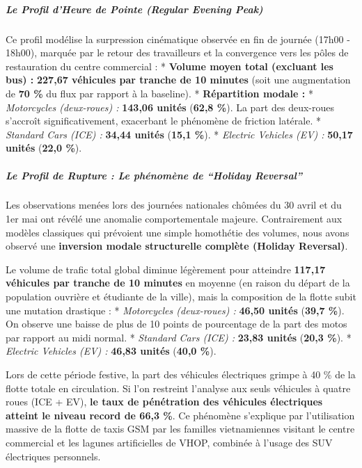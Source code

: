 \documentclass[10pt, a4paper]{article}
\begin{document}
\subparagraph{Le Profil d'Heure de Pointe (Regular Evening
Peak)}\label{le-profil-dheure-de-pointe-regular-evening-peak}

Ce profil modélise la surpression cinématique observée en fin de journée
(17h00 - 18h00), marquée par le retour des travailleurs et la
convergence vers les pôles de restauration du centre commercial : *
\textbf{Volume moyen total (excluant les bus) :} \textbf{227,67
véhicules par tranche de 10 minutes} (soit une augmentation de
\textbf{70 \%} du flux par rapport à la baseline). * \textbf{Répartition
modale :} * \emph{Motorcycles (deux-roues) :} \textbf{143,06 unités}
(\textbf{62,8 \%}). La part des deux-roues s'accroît significativement,
exacerbant le phénomène de friction latérale. * \emph{Standard Cars
(ICE) :} \textbf{34,44 unités} (\textbf{15,1 \%}). * \emph{Electric
Vehicles (EV) :} \textbf{50,17 unités} (\textbf{22,0 \%}).

\subparagraph{Le Profil de Rupture : Le phénomène de ``Holiday
Reversal''}\label{le-profil-de-rupture-le-phuxe9nomuxe8ne-de-holiday-reversal}

Les observations menées lors des journées nationales chômées du 30 avril
et du 1er mai ont révélé une anomalie comportementale majeure.
Contrairement aux modèles classiques qui prévoient une simple homothétie
des volumes, nous avons observé une \textbf{inversion modale
structurelle complète (Holiday Reversal)}.

Le volume de trafic total global diminue légèrement pour atteindre
\textbf{117,17 véhicules par tranche de 10 minutes} en moyenne (en
raison du départ de la population ouvrière et étudiante de la ville),
mais la composition de la flotte subit une mutation drastique : *
\emph{Motorcycles (deux-roues) :} \textbf{46,50 unités} (\textbf{39,7
\%}). On observe une baisse de plus de 10 points de pourcentage de la
part des motos par rapport au midi normal. * \emph{Standard Cars (ICE)
:} \textbf{23,83 unités} (\textbf{20,3 \%}). * \emph{Electric Vehicles
(EV) :} \textbf{46,83 unités} (\textbf{40,0 \%}).

Lors de cette période festive, la part des véhicules électriques grimpe
à 40 \% de la flotte totale en circulation. Si l'on restreint l'analyse
aux seuls véhicules à quatre roues (ICE + EV), \textbf{le taux de
pénétration des véhicules électriques atteint le niveau record de 66,3
\%}. Ce phénomène s'explique par l'utilisation massive de la flotte de
taxis GSM par les familles vietnamiennes visitant le centre commercial
et les lagunes artificielles de VHOP, combinée à l'usage des SUV
électriques personnels.
\end{document}
